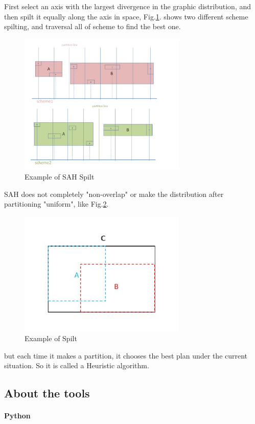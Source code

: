 \documentclass[conference]{IEEEtran}
\begin{document}
First select an axis with the largest divergence in the graphic distribution, and then spilt it equally along the axis in space, 
Fig.\ref{Example of SAH Spilt}. shows two different scheme spilting, and traversal all of scheme to find the best one.
\begin{figure}[ht]
    \caption{Example of SAH Spilt}
    \centering 
    \label{Example of SAH Spilt}
    \includegraphics[width=8cm]{Example_SAH_Spilt.jpg}
\end{figure}


SAH does not completely "non-overlap" or make the distribution after partitioning "uniform", like Fig.\ref{Example of Spilt}.
\begin{figure}[ht]
    \caption{Example of Spilt}
    \label{Example of Spilt}
    \centering 
    \includegraphics[width=8cm]{Example_Spilt.jpg}
\end{figure}
but each time it makes a partition, it chooses the best plan under the current situation. So it is called a Heuristic algorithm.


\subsection{About the tools}
\paragraph{Python}
\end{document}
